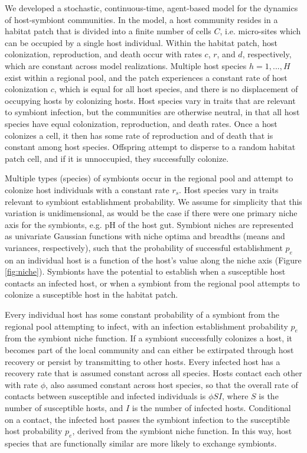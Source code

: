 We developed a stochastic, continuous-time, agent-based model for the dynamics of host-symbiont communities.
In the model, a host community resides in a habitat patch that is divided into a finite number of cells $C$, i.e. micro-sites which can be occupied by a single host individual.
Within the habitat patch, host colonization, reproduction, and death occur with rates $c$, $r$, and $d$, respectively, which are constant across model realizations.
Multiple host species $h=1, ..., H$ exist within a regional pool, and the patch experiences a constant rate of host colonization $c$, which is equal for all host species, and there is no displacement of occupying hosts by colonizing hosts.
Host species vary in traits that are relevant to symbiont infection, but the communities are otherwise neutral, in that all host species have equal colonization, reproduction, and death rates.
Once a host colonizes a cell, it then has some rate of reproduction and of death that is constant among host species.
Offspring attempt to disperse to a random habitat patch cell, and if it is unnoccupied, they successfully colonize.

Multiple types (species) of symbionts occur in the regional pool and attempt to colonize host individuals with a constant rate $r_s$.
Host species vary in traits relevant to symbiont establishment probability.
We assume for simplicity that this variation is unidimensional, as would be the case if there were one primary niche axis for the symbionts, e.g. pH of the host gut.
Symbiont niches are represented as univariate Gaussian functions with niche optima and breadths (means and variances, respectively), such that the probability of successful establishment $p_e$ on an individual host is a function of the host's value along the niche axis (Figure \ref{fig:niche}).
Symbionts have the potential to establish when a susceptible host contacts an infected host, or when a symbiont from the regional pool attempts to colonize a susceptible host in the habitat patch.

Every individual host has some constant probability of a symbiont from the regional pool attempting to infect, with an infection establishment probability $p_e$ from the symbiont niche function.
If a symbiont successfully colonizes a host, it becomes part of the local community and can either be extirpated through host recovery or persist by transmitting to other hosts.
Every infected host has a recovery rate that is assumed constant across all species.
Hosts contact each other with rate $\phi$, also assumed constant across host species, so that the overall rate of contacts between susceptible and infected individuals is $\phi S I$, where $S$ is the number of susceptible hosts, and $I$ is the number of infected hosts.
Conditional on a contact, the infected host passes the symbiont infection to the susceptible host probability $p_e$, derived from the symbiont niche function.
In this way, host species that are functionally similar are more likely to exchange symbionts.

